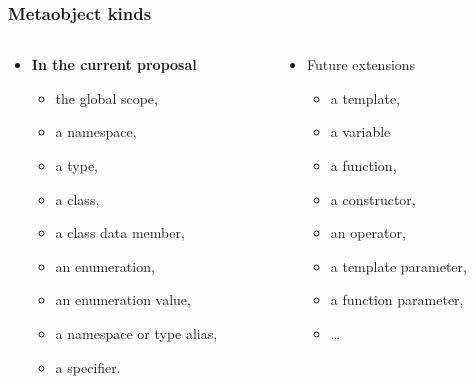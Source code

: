 \documentclass[compress,table,xcolor=table]{beamer}
\begin{document}
\begin{frame}
\frametitle{Metaobject kinds}
    \large
    \begin{columns}[T]
      \begin{column}{0.50\textwidth}
      \begin{itemize}
        \item \textbf{In the current proposal}
        \begin{itemize}
          \normalsize
          \item the global scope,
          \item a namespace,
          \item a type,
          \item a class,
          \item a class data member,
          \item an enumeration,
          \item an enumeration value,
          \item a namespace or type alias,
          \item a specifier.
        \end{itemize}
      \end{itemize}
      \end{column}
      \begin{column}{0.45\textwidth}
      \begin{itemize}
        \item Future extensions\footnotemark
        \begin{itemize}
          \normalsize
          \item a template,
          \item a variable
          \item a function,
          \item a constructor,
          \item an operator,
          \item a template parameter,
          \item a function parameter,
          \item \ldots
        \end{itemize}
      \end{itemize}
      \end{column}
    \end{columns}
\end{frame}
\end{document}
